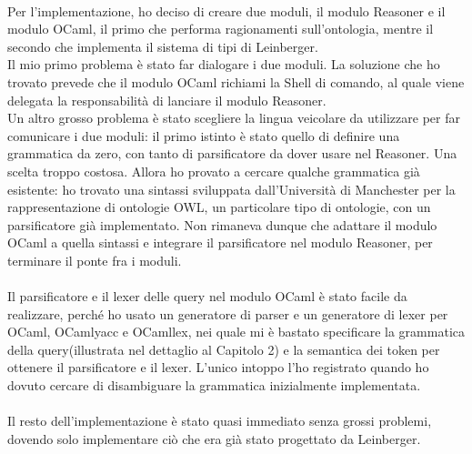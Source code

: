 \paragraph{} Per l'implementazione, ho deciso di creare due moduli, il modulo Reasoner e il modulo OCaml, il primo che performa ragionamenti sull'ontologia, mentre il secondo che implementa il sistema di tipi di Leinberger.\\
Il mio primo problema è stato far dialogare i due moduli. La soluzione che ho trovato prevede che il modulo OCaml richiami la Shell di comando, al quale viene delegata la responsabilità di lanciare il modulo Reasoner. \\
Un altro grosso problema è stato scegliere la lingua veicolare da utilizzare per far comunicare i due moduli: il primo istinto è stato quello di definire una grammatica da zero, con tanto di parsificatore da dover usare nel Reasoner. Una scelta troppo costosa. Allora ho provato a cercare qualche grammatica già esistente: ho trovato una sintassi sviluppata dall'Università di Manchester per la rappresentazione di ontologie OWL, un particolare tipo di ontologie, con un parsificatore già implementato. Non rimaneva dunque che adattare il modulo OCaml a quella sintassi e integrare il parsificatore nel modulo Reasoner, per terminare il ponte fra i moduli.

\paragraph{} Il parsificatore e il lexer delle query nel modulo OCaml è stato facile da realizzare, perché ho usato un generatore di parser e un generatore di lexer per OCaml, OCamlyacc e OCamllex, nei quale mi è bastato specificare la grammatica della query(illustrata nel dettaglio al Capitolo 2) e la semantica dei token per ottenere il parsificatore e il lexer. L'unico intoppo l'ho registrato quando ho dovuto cercare di disambiguare la grammatica inizialmente implementata. 

\paragraph{} Il resto dell'implementazione è stato quasi immediato senza grossi problemi, dovendo solo implementare ciò che era già stato progettato da Leinberger.